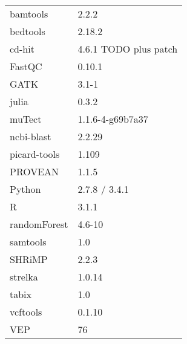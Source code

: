 \documentclass[11pt,a4paper,final,twoside]{memoir}
\begin{document}
\begin{tabular}{ll}
\toprule
  bamtools                    & 2.2.2 \\
  bedtools                    & 2.18.2 \\
  cd-hit                      & 4.6.1 TODO plus patch \\
  FastQC                      & 0.10.1 \\
  GATK                        & 3.1-1 \\
  julia                       & 0.3.2 \\
  muTect                      & 1.1.6-4-g69b7a37 \\
  ncbi-blast                  & 2.2.29 \\
  picard-tools                & 1.109 \\
  PROVEAN                     & 1.1.5 \\
  Python                      & 2.7.8 / 3.4.1 \\
  R                           & 3.1.1 \\
  \quad randomForest          & 4.6-10 \\
  samtools                    & 1.0 \\
  SHRiMP                      & 2.2.3 \\
  strelka                     & 1.0.14 \\
  tabix                       & 1.0 \\
  vcftools                    & 0.1.10 \\
  VEP                         & 76 \\
\bottomrule
\end{tabular}

\mainmatter
\openright








\end{document}
